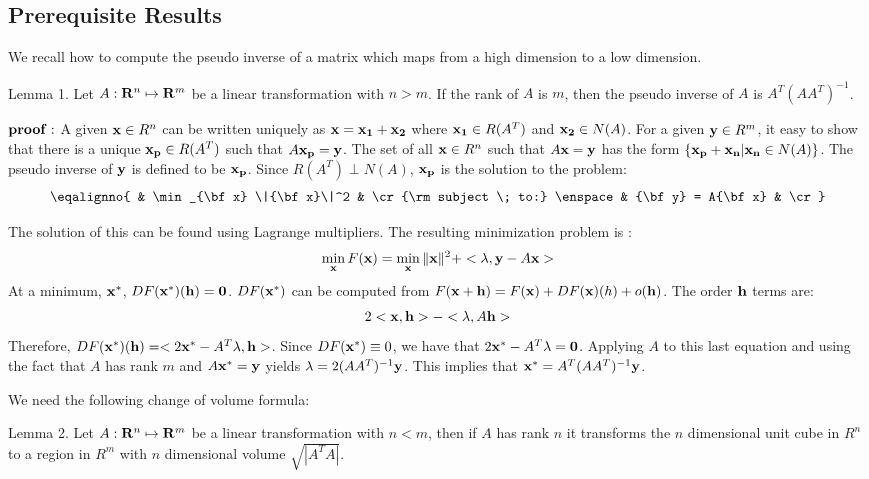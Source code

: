 \smallskip

\subsection{Prerequisite Results}
We recall how to compute the pseudo inverse of a matrix which maps from 
a high dimension to a low dimension.

\proclaim Lemma 1. Let $A : {\bf R}^n \mapsto {\bf R}^m$ be a linear 
transformation with $n > m$. If the rank of $A$ is $m$, then the pseudo 
inverse of $A$ is $A^T (AA^T)^{-1}$.

${\bf proof:}$ A given ${\bf x} \in R^n$ can be written uniquely 
as ${\bf x} = {\bf x_1} + {\bf x_2}$ 
where ${\bf x_1} \in R(A^T)$ and ${\bf x_2} \in N(A)$. For a given 
${\bf y} \in R^m$, it easy to show that there is a unique 
${\bf x_p} \in R(A^T)$ such that 
$A {\bf x_p} = {\bf y}$. The set of all ${\bf x} \in R^n$ such that 
$A{\bf x} = {\bf y}$ has the form 
$\{ {\bf x_p + x_n} | {\bf x_n} \in N(A)\}$. The pseudo inverse of ${\bf y}$
is defined to be ${\bf x_p}$. Since $R(A^T) \perp N(A)$, ${\bf x_p}$ is the 
solution to the problem:
$$
\eqalignno{
& \min_{\bf x} \|{\bf x}\|^2 & \cr
{\rm subject \; to:} \enspace & {\bf y} = A{\bf x} & \cr
}
$$

The solution of this can be found using Lagrange multipliers. The resulting
minimization problem is :
$$
\min_{\bf x} F({\bf x}) = \min_{\bf x} \|{\bf x}\|^2 + <{\bf \lambda}, {\bf y} - A{\bf x}>
$$
At a minimum, ${\bf x}^*$, $DF({\bf x}^*) ({\bf h}) = {\bf 0}$. 
$DF({\bf x}^*)$ 
can be computed from 
$F({\bf x} + {\bf h}) = F({\bf x}) + DF({\bf x})(h) + o({\bf h})$. The order 
${\bf h}$ terms are:
$$
2<{\bf x}, {\bf h}> - <{\bf \lambda}, A{\bf h}>
$$
Therefore, $DF({\bf x}^*)({\bf h}) = 
<2 {\bf x}^* - A^T {\bf \lambda}, {\bf h}>$. Since $DF({\bf x}^*) \equiv 0$, we
have that $2 {\bf x}^* - A^T {\bf \lambda} = {\bf 0}$. Applying $A$ to this 
last equation and using the fact that $A$ has rank $m$ and 
$A{\bf x}^* = {\bf y}$ yields ${\bf \lambda} = 2 (A A^T)^{-1} {\bf y}$.
This implies that ${\bf x}^* = A^T (A A^T)^{-1} {\bf y}$.

\bigskip

We need the following change of volume formula:

\proclaim Lemma 2. Let 
$A : {\bf R}^n \mapsto {\bf R}^m$ be a linear 
transformation with $n < m$, then if $A$ has rank $n$ it transforms the 
$n$ dimensional unit cube in $R^n$ to a region in $R^m$ with 
$n$ dimensional volume 
$\sqrt{ |A^T A|}$.


